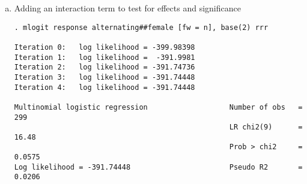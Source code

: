 \documentclass{article}
\begin{document}
\begin{enumerate}[c.]
\item Adding an interaction term to test for effects and significance

\begin{verbatim}
. mlogit response alternating##female [fw = n], base(2) rrr

Iteration 0:   log likelihood = -399.98398  
Iteration 1:   log likelihood =  -391.9981  
Iteration 2:   log likelihood = -391.74736  
Iteration 3:   log likelihood = -391.74448  
Iteration 4:   log likelihood = -391.74448  

Multinomial logistic regression                   Number of obs   =        299
                                                  LR chi2(9)      =      16.48
                                                  Prob > chi2     =     0.0575
Log likelihood = -391.74448                       Pseudo R2       =     0.0206


\end{verbatim}
\end{enumerate}
\end{document}

